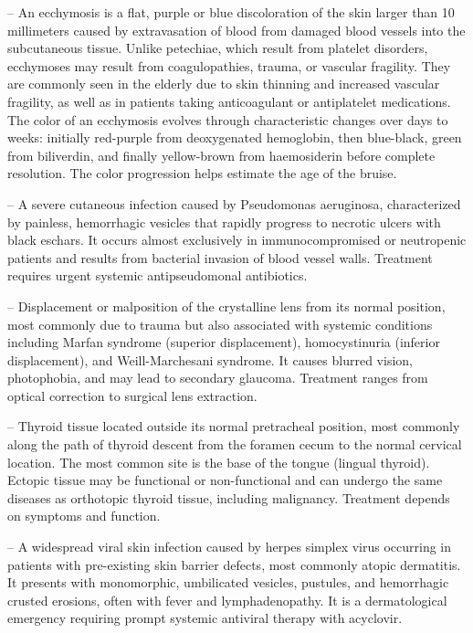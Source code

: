 -- An ecchymosis is a flat, purple or blue discoloration of the skin larger than 10 millimeters caused by extravasation of blood from damaged blood vessels into the subcutaneous tissue. Unlike petechiae, which result from platelet disorders, ecchymoses may result from coagulopathies, trauma, or vascular fragility. They are commonly seen in the elderly due to skin thinning and increased vascular fragility, as well as in patients taking anticoagulant or antiplatelet medications. The color of an ecchymosis evolves through characteristic changes over days to weeks: initially red-purple from deoxygenated hemoglobin, then blue-black, green from biliverdin, and finally yellow-brown from haemosiderin before complete resolution. The color progression helps estimate the age of the bruise.

-- A severe cutaneous infection caused by Pseudomonas aeruginosa, characterized by painless, hemorrhagic vesicles that rapidly progress to necrotic ulcers with black eschars. It occurs almost exclusively in immunocompromised or neutropenic patients and results from bacterial invasion of blood vessel walls. Treatment requires urgent systemic antipseudomonal antibiotics.

-- Displacement or malposition of the crystalline lens from its normal position, most commonly due to trauma but also associated with systemic conditions including Marfan syndrome (superior displacement), homocystinuria (inferior displacement), and Weill-Marchesani syndrome. It causes blurred vision, photophobia, and may lead to secondary glaucoma. Treatment ranges from optical correction to surgical lens extraction.

-- Thyroid tissue located outside its normal pretracheal position, most commonly along the path of thyroid descent from the foramen cecum to the normal cervical location. The most common site is the base of the tongue (lingual thyroid). Ectopic tissue may be functional or non-functional and can undergo the same diseases as orthotopic thyroid tissue, including malignancy. Treatment depends on symptoms and function.

-- A widespread viral skin infection caused by herpes simplex virus occurring in patients with pre-existing skin barrier defects, most commonly atopic dermatitis. It presents with monomorphic, umbilicated vesicles, pustules, and hemorrhagic crusted erosions, often with fever and lymphadenopathy. It is a dermatological emergency requiring prompt systemic antiviral therapy with acyclovir.


